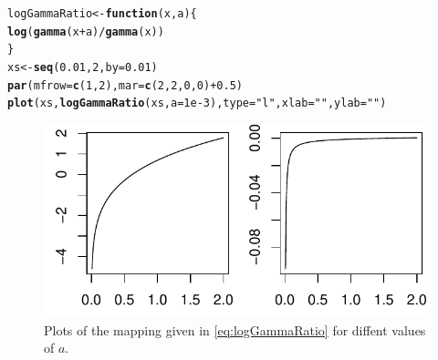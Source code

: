 \documentclass{article}\usepackage[]{graphicx}\usepackage[]{color}
\makeatletter
\def\maxwidth{ %
  \ifdim\Gin@nat@width>\linewidth
    \linewidth
  \else
    \Gin@nat@width
  \fi
}
\newcommand{\hlnum}[1]{\textcolor[rgb]{0.686,0.059,0.569}{#1}}%
\newcommand{\hlstr}[1]{\textcolor[rgb]{0.192,0.494,0.8}{#1}}%
\newcommand{\hlopt}[1]{\textcolor[rgb]{0,0,0}{#1}}%
\newcommand{\hlstd}[1]{\textcolor[rgb]{0.345,0.345,0.345}{#1}}%
\newcommand{\hlkwa}[1]{\textcolor[rgb]{0.161,0.373,0.58}{\textbf{#1}}}%
\newcommand{\hlkwb}[1]{\textcolor[rgb]{0.69,0.353,0.396}{#1}}%
\newcommand{\hlkwc}[1]{\textcolor[rgb]{0.333,0.667,0.333}{#1}}%
\newcommand{\hlkwd}[1]{\textcolor[rgb]{0.737,0.353,0.396}{\textbf{#1}}}%
\newenvironment{kframe}{%
 \def\at@end@of@kframe{}%
 \ifinner\ifhmode%
  \def\at@end@of@kframe{\end{minipage}}%
  \begin{minipage}{\columnwidth}%
 \fi\fi%
 \def\FrameCommand##1{\hskip\@totalleftmargin \hskip-\fboxsep
 \colorbox{shadecolor}{##1}\hskip-\fboxsep
     \hskip-\linewidth \hskip-\@totalleftmargin \hskip\columnwidth}%
 \MakeFramed {\advance\hsize-\width
   \@totalleftmargin\z@ \linewidth\hsize
   \@setminipage}}%
 {\par\unskip\endMakeFramed%
 \at@end@of@kframe}
\newenvironment{knitrout}{}{} %
\makeatother
\begin{document}
\begin{knitrout}\footnotesize
{}\color{fgcolor}\begin{kframe}
\begin{alltt}
\hlstd{logGammaRatio} \hlkwb{<-} \hlkwa{function}\hlstd{(}\hlkwc{x}\hlstd{,} \hlkwc{a}\hlstd{) \{}
  \hlkwd{log}\hlstd{(}\hlkwd{gamma}\hlstd{(x} \hlopt{+} \hlstd{a)}\hlopt{/}\hlkwd{gamma}\hlstd{(x))}
\hlstd{\}}
\hlstd{xs} \hlkwb{<-} \hlkwd{seq}\hlstd{(}\hlnum{0.01}\hlstd{,} \hlnum{2}\hlstd{,} \hlkwc{by} \hlstd{=} \hlnum{0.01}\hlstd{)}
\hlkwd{par}\hlstd{(}\hlkwc{mfrow} \hlstd{=} \hlkwd{c}\hlstd{(}\hlnum{1}\hlstd{,}\hlnum{2}\hlstd{),} \hlkwc{mar} \hlstd{=} \hlkwd{c}\hlstd{(}\hlnum{2}\hlstd{,}\hlnum{2}\hlstd{,}\hlnum{0}\hlstd{,}\hlnum{0}\hlstd{)}\hlopt{+} \hlnum{0.5}\hlstd{)}
\hlkwd{plot}\hlstd{(xs,} \hlkwd{logGammaRatio}\hlstd{(xs,} \hlkwc{a} \hlstd{=} \hlnum{1e-3}\hlstd{),} \hlkwc{type} \hlstd{=} \hlstr{"l"}\hlstd{,} \hlkwc{xlab} \hlstd{=} \hlstr{""}\hlstd{,} \hlkwc{ylab} \hlstd{=} \hlstr{""}\hlstd{)}
\end{alltt}
\end{kframe}\begin{figure}[ht]

\includegraphics[width=\maxwidth]{figure/log_gamma_ratio} \caption[]{Plots of the mapping given in \eqref{eq:logGammaRatio} for diffent values of $a$.\label{fig:log_gamma_ratio}}
\end{figure}


\end{knitrout}
\end{document}
